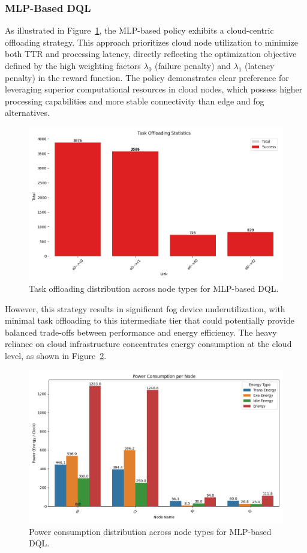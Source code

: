 \documentclass[preprint,3p,authoryear]{elsarticle}
\begin{document}
\subsubsection{MLP-Based DQL}\label{subsubsec:mlp-DQL-analysis}

As illustrated in Figure~\ref{fig:mlp-task-offloading-stats}, the MLP-based policy exhibits a cloud-centric offloading strategy. This approach prioritizes cloud node utilization to minimize both TTR and processing latency, directly reflecting the optimization objective defined by the high weighting factors $\lambda_0$ (failure penalty) and $\lambda_1$ (latency penalty) in the reward function. The policy demonstrates clear preference for leveraging superior computational resources in cloud nodes, which possess higher processing capabilities and more stable connectivity than edge and fog alternatives.

\begin{figure}[H]
    \centering
    \includegraphics[width=0.5\linewidth]{figs/MLP/task_offloading_statistics.png}
    \caption{Task offloading distribution across node types for MLP-based DQL.}
    \label{fig:mlp-task-offloading-stats}
\end{figure}

However, this strategy results in significant fog device underutilization, with minimal task offloading to this intermediate tier that could potentially provide balanced trade-offs between performance and energy efficiency. The heavy reliance on cloud infrastructure concentrates energy consumption at the cloud level, as shown in Figure~\ref{fig:mlp-power-consumption}.

\begin{figure}[H]
    \centering
    \includegraphics[width=0.5\linewidth]{figs/MLP/power_consumption_per_node.png}
    \caption{Power consumption distribution across node types for MLP-based DQL.}
    \label{fig:mlp-power-consumption}
\end{figure}
\end{document}
